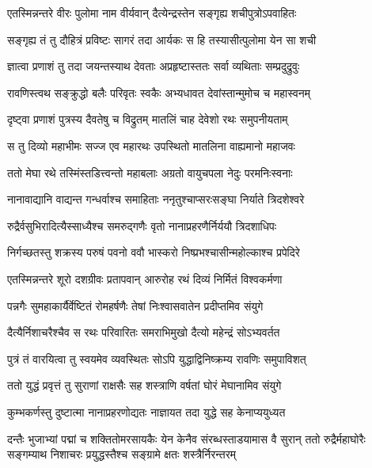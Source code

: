 \twolineshloka
{एतस्मिन्नन्तरे वीरः पुलोमा नाम वीर्यवान्}
{दैत्येन्द्रस्तेन सङ्गृह्य शचीपुत्रोऽपवाहितः} %

\twolineshloka
{सङ्गृह्य तं तु दौहित्रं प्रविष्टः सागरं तदा}
{आर्यकः स हि तस्यासीत्पुलोमा येन सा शची} %

\twolineshloka
{ज्ञात्वा प्रणाशं तु तदा जयन्तस्याथ देवताः}
{अप्रहृष्टास्ततः सर्वा व्यथिताः सम्प्रदुद्रुवुः} %

\twolineshloka
{रावणिस्त्वथ सङ्क्रुद्धो बलैः परिवृतः स्वकैः}
{अभ्यधावत देवांस्तान्मुमोच च महास्वनम्} %

\twolineshloka
{दृष्ट्वा प्रणाशं पुत्रस्य दैवतेषु च विद्रुतम्}
{मातलिं चाह देवेशो रथः समुपनीयताम्} %

\twolineshloka
{स तु दिव्यो महाभीमः सज्ज एव महारथः}
{उपस्थितो मातलिना वाह्यमानो महाजवः} %

\twolineshloka
{ततो मेघा रथे तस्मिंस्तडित्त्वन्तो महाबलाः}
{अग्रतो वायुचपला नेदुः परमनिःस्वनाः} %

\twolineshloka
{नानावाद्यानि वाद्यन्त गन्धर्वाश्च समाहिताः}
{ननृतुश्चाप्सरःसङ्घा निर्याते त्रिदशेश्वरे} %

\twolineshloka
{रुद्रैर्वसुभिरादित्यैस्साध्यैश्च समरुद्गणैः}
{वृतो नानाप्रहरणैर्निर्ययौ त्रिदशाधिपः} %

\twolineshloka
{निर्गच्छतस्तु शक्रस्य परुषं पवनो ववौ}
{भास्करो निष्प्रभश्चासीन्महोल्काश्च प्रपेदिरे} %

\twolineshloka
{एतस्मिन्नन्तरे शूरो दशग्रीवः प्रतापवान्}
{आरुरोह रथं दिव्यं निर्मितं विश्वकर्मणा} %

\twolineshloka
{पन्नगैः सुमहाकार्यैर्वेष्टितं रोमहर्षणैः}
{तेषां निःश्वासवातेन प्रदीप्तमिव संयुगे} %

\twolineshloka
{दैत्यैर्निशाचरैश्चैव स रथः परिवारितः}
{समराभिमुखो दैत्यो महेन्द्रं सोऽभ्यवर्तत} %

\twolineshloka
{पुत्रं तं वारयित्वा तु स्वयमेव व्यवस्थितः}
{सोऽपि युद्धाद्विनिष्क्रम्य रावणिः समुपाविशत्} %

\twolineshloka
{ततो युद्धं प्रवृत्तं तु सुराणां राक्षसैः सह}
{शस्त्राणि वर्षतां घोरं मेघानामिव संयुगे} %

\twolineshloka
{कुम्भकर्णस्तु दुष्टात्मा नानाप्रहरणोद्यतः}
{नाज्ञायत तदा युद्धे सह केनाप्ययुध्यत} %

\threelineshloka
{दन्तैः भुजाभ्यां पद्मां च शक्तितोमरसायकैः}
{येन केनैव संरब्धस्ताडयामास वै सुरान् ततो रुद्रैर्महाघोरैः सङ्गम्याथ निशाचरः}
{प्रयुद्धस्तैश्च सङ्ग्रामे क्षतः शस्त्रैर्निरन्तरम्} %

